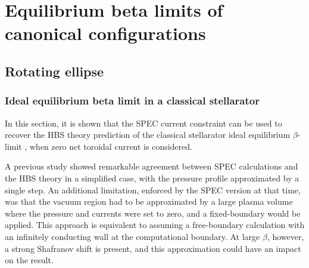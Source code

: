 \documentclass[my_thesis.tex]{subfiles}
\begin{document}
\chapter{Equilibrium beta limits of canonical configurations}

\section{Rotating ellipse}

\subsection{Ideal equilibrium beta limit in a classical stellarator} \label{sec.idealbetalimit}

In this section, it is shown that the \ac{SPEC} current constraint can be used to recover the \ac{HBS} theory prediction of the classical stellarator ideal equilibrium $\beta$-limit \citep{Freidberg2014,wakataniStellaratorHeliotronDevices1998}, when zero net toroidal current is considered.  

A previous study \citep{Loizu2017} showed remarkable agreement between \ac{SPEC} calculations and the \ac{HBS} theory in a simplified case, with the pressure profile approximated by a single step. An additional limitation, enforced by the \ac{SPEC} version at that time, was that the vacuum region had to be approximated by a large plasma volume where the pressure and currents were set to zero, and a fixed-boundary would be applied. This approach is equivalent to assuming a free-boundary calculation with an infinitely conducting wall at the computational boundary. At large $\beta$, however, a strong Shafranov shift is present, and this approximation could have an impact on the result.
\end{document}
